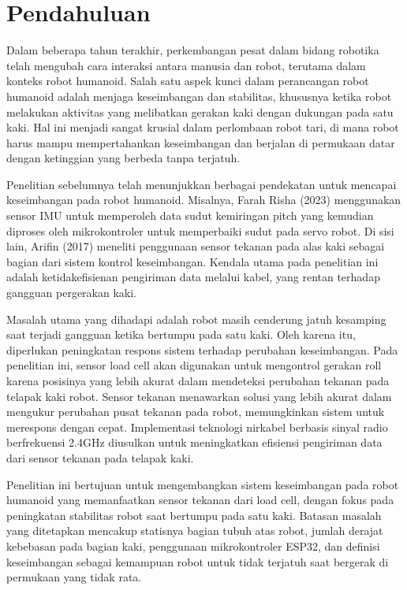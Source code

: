 \section{Pendahuluan}
\label{sec:pendahuluan}

Dalam beberapa tahun terakhir, perkembangan pesat dalam bidang robotika telah mengubah cara interaksi antara manusia dan robot, terutama dalam konteks robot humanoid\cite{chiang2020posture}. Salah satu aspek kunci dalam perancangan robot humanoid adalah menjaga keseimbangan dan stabilitas, khususnya ketika robot melakukan aktivitas yang melibatkan gerakan kaki dengan dukungan pada satu kaki. Hal ini menjadi sangat krusial dalam perlombaan robot tari, di mana robot harus mampu mempertahankan keseimbangan dan berjalan di permukaan datar dengan ketinggian yang berbeda tanpa terjatuh.

Penelitian sebelumnya telah menunjukkan berbagai pendekatan untuk mencapai keseimbangan pada robot humanoid. Misalnya, Farah Risha (2023)\cite{farah} menggunakan sensor IMU untuk memperoleh data sudut kemiringan pitch yang kemudian diproses oleh mikrokontroler untuk memperbaiki sudut pada servo robot. Di sisi lain, Arifin (2017)\cite{arifin2017implementasi} meneliti penggunaan sensor tekanan pada alas kaki sebagai bagian dari sistem kontrol keseimbangan. Kendala utama pada penelitian ini adalah ketidakefisienan pengiriman data melalui kabel, yang rentan terhadap gangguan pergerakan kaki.

Masalah utama yang dihadapi adalah robot masih cenderung jatuh kesamping saat terjadi gangguan ketika bertumpu pada satu kaki. Oleh karena itu, diperlukan peningkatan respons sistem terhadap perubahan keseimbangan. Pada penelitian ini, sensor load cell akan digunakan untuk mengontrol gerakan roll karena posisinya yang lebih akurat dalam mendeteksi perubahan tekanan pada telapak kaki robot. Sensor tekanan menawarkan solusi yang lebih akurat dalam mengukur perubahan pusat tekanan pada robot, memungkinkan sistem untuk merespons dengan cepat. Implementasi teknologi nirkabel berbasis sinyal radio berfrekuensi 2.4GHz diusulkan untuk meningkatkan efisiensi pengiriman data dari sensor tekanan pada telapak kaki.

Penelitian ini bertujuan untuk mengembangkan sistem keseimbangan pada robot humanoid yang memanfaatkan sensor tekanan dari load cell, dengan fokus pada peningkatan stabilitas robot saat bertumpu pada satu kaki. Batasan masalah yang ditetapkan mencakup statisnya bagian tubuh atas robot, jumlah derajat kebebasan pada bagian kaki, penggunaan mikrokontroler ESP32, dan definisi keseimbangan sebagai kemampuan robot untuk tidak terjatuh saat bergerak di permukaan yang tidak rata.